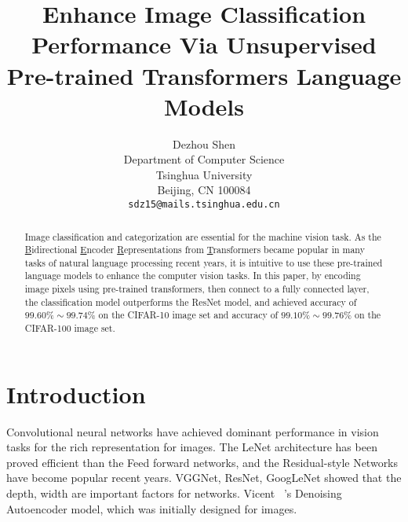\documentclass[10pt,twocolumn,letterpaper]{article}
\begin{document}
\title{Enhance Image Classification Performance Via Unsupervised Pre-trained Transformers Language Models}

\author{Dezhou Shen\\
Department of Computer Science\\
Tsinghua University\\
Beijing, CN 100084\\
{\tt\small sdz15@mails.tsinghua.edu.cn}
}

\maketitle
\ificcvfinal\thispagestyle{empty}\fi

\begin{abstract}

  Image classification and categorization are essential for the machine vision task.
  As the \underline{B}idirectional \underline{E}ncoder \underline{R}epresentations from \underline{T}ransformers became popular in many tasks of natural language processing recent years,
  it is intuitive to use these pre-trained language models to enhance the computer vision tasks.
  In this paper, by encoding image pixels using pre-trained transformers, then connect to a fully connected layer,
  the classification model outperforms the ResNet model,
  and achieved accuracy of $99.60\%\sim99.74\%$ on the CIFAR-10 image set and accuracy of $99.10\%\sim99.76\%$ on the CIFAR-100 image set.

\end{abstract}

\section{Introduction}

  Convolutional neural networks have achieved dominant performance in vision tasks for the rich representation for images.
  The LeNet architecture has been proved efficient than the Feed forward networks, and the Residual-style Networks have become popular recent years.
  VGGNet, ResNet, GoogLeNet showed that the depth, width are important factors for networks.
  Vicent \etal~\cite{vincent2008extracting}'s Denoising Autoencoder model, which was initially designed for images.
\end{document}
